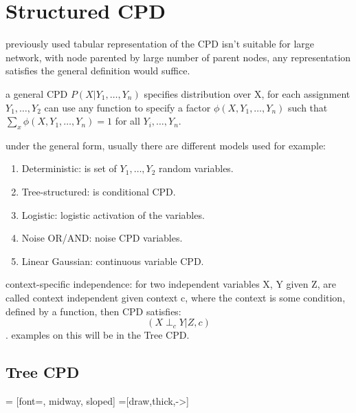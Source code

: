 \documentclass[4apaper,12pt]{book}
\begin{document}
  \section{Structured CPD}
  \begin{description}
  \item previously used tabular representation of the CPD isn't suitable for large network, with node parented by large number of parent nodes, any representation satisfies the general definition would suffice.
  \item a general CPD $P(X|Y_1,\dots,Y_n)$ specifies distribution over X, for each assignment $Y_1,\dots,Y_2$ can use any function to specify a factor $\phi(X,Y_1,\dots,Y_n)$ such that $\sum_x\phi(X,Y_1,\dots,Y_n)=1$ for all $Y_i,\dots,Y_n$.
  \item under the general form, usually there are different models used for example:\begin{enumerate}
  \item Deterministic: is set of $Y_1,\dots,Y_2$  random variables.
  \item Tree-structured: is conditional CPD.
  \item Logistic: logistic activation of the variables.
  \item Noise OR/AND: noise CPD variables.
  \item Linear Gaussian: continuous variable CPD.

  \end{enumerate}
  \item context-specific independence: for two independent variables X, Y given Z, are called context independent given context c, where the context is some condition, defined by a function, then CPD satisfies: $$ (X\perp_c Y | Z,c) $$. examples on this will be in the Tree CPD.

    \subsection{Tree CPD}
    \begin{description}
       = [font=\scriptsize, midway, sloped]
       =[draw,thick,->]
    \item  {}
\end{description}
\end{description}
\end{document}

